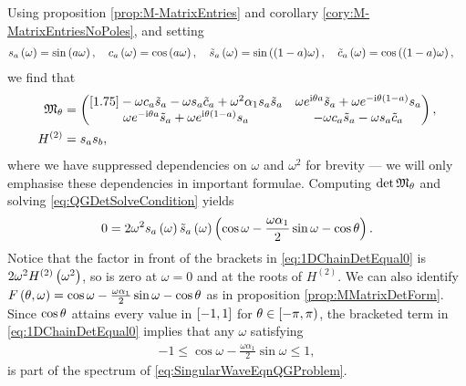 Using proposition \ref{prop:M-MatrixEntries} and corollary \ref{cory:M-MatrixEntriesNoPoles}, and setting
\begin{align*}
	s_a\left( \omega \right) &= \sin\left( a\omega \right), \quad c_a\left( \omega \right) = \cos\left( a\omega \right), 
	\quad \tilde{s}_a\left( \omega \right) = \sin\left( (1-a)\omega \right), \quad \tilde{c}_a\left( \omega \right) = \cos\left( (1-a)\omega \right),
\end{align*} 
we find that
\begin{align*}
	\mathfrak{M}_{\theta} &= 
	\begin{pmatrix}[1.75]
		-\omega c_a \tilde{s}_a - \omega s_a \tilde{c}_{a} + \omega^2\alpha_1 s_a \tilde{s}_a &
		\omega e^{\mathrm{i}\theta a} \tilde{s}_a + \omega e^{-\mathrm{i}\theta(1-a)} s_a \\
		\omega e^{-\mathrm{i}\theta a} \tilde{s}_a + \omega e^{\mathrm{i}\theta(1-a)} s_a &
		-\omega c_a \tilde{s}_a - \omega s_a \tilde{c}_a
	\end{pmatrix}, \\
	H^{(2)} &= s_a s_b,\\
\end{align*}
where we have suppressed dependencies on $\omega$ and $\omega^2$ for brevity --- we will only emphasise these dependencies in important formulae.
Computing $\det\mathfrak{M}_{\theta}$ and solving \eqref{eq:QGDetSolveCondition} yields
\begin{align} \label{eq:1DChainDetEqual0}
	0 = 2\omega^2 s_a\left( \omega \right) \tilde{s}_a\left( \omega \right) \left(  \cos\omega - \frac{\omega\alpha_1}{2}\sin\omega - \cos\theta  \right).
\end{align}
Notice that the factor in front of the brackets in \eqref{eq:1DChainDetEqual0} is $2\omega^2 H^{(2)}\left( \omega^2 \right)$, so is zero at $\omega=0$ and at the roots of $H^{(2)}$.
We can also identify $F\left( \theta,\omega \right) = \cos\omega - \frac{\omega\alpha_1}{2}\sin\omega - \cos\theta$ as in proposition \ref{prop:MMatrixDetForm}.
Since $\cos\theta$ attains every value in $\left[ -1,1 \right]$ for $\theta\in\left[-\pi,\pi\right)$, the bracketed term in \eqref{eq:1DChainDetEqual0} implies that any $\omega$ satisfying
\begin{align*}
	-1 \leq \cos\omega - \frac{\omega\alpha_1}{2}\sin\omega \leq 1,
\end{align*}
is part of the spectrum of \eqref{eq:SingularWaveEqnQGProblem}.

